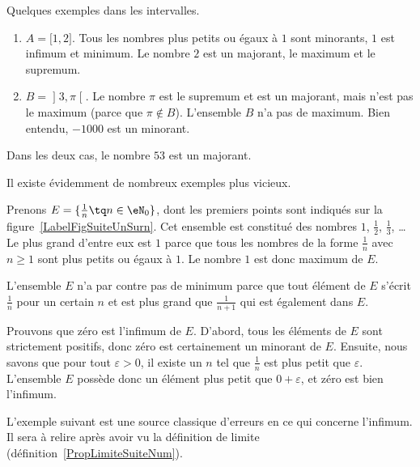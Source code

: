 \begin{example}
	Quelques exemples dans les intervalles.
	\begin{enumerate}
		\item
		      $A=\mathopen[ 1 , 2 \mathclose]$. Tous les nombres plus petits ou égaux à $1$ sont minorants, $1$ est infimum et minimum. Le nombre $2$ est un majorant, le maximum et le supremum.
		\item
		      $B=\mathopen] 3 , \pi \mathclose[$. Le nombre $\pi$ est le supremum et est un majorant, mais n'est pas le maximum (parce que $\pi\notin B$). L'ensemble $B$ n'a pas de maximum. Bien entendu, $-1000$ est un minorant.
	\end{enumerate}
	Dans les deux cas, le nombre $53$ est un majorant.
\end{example}

Il existe évidemment de nombreux exemples plus vicieux.

\begin{example}
	Prenons $E=\{ \frac{1}{ n }\tq n\in\eN_0 \}$, dont les premiers points sont indiqués sur la figure~\ref{LabelFigSuiteUnSurn}. Cet ensemble est constitué des nombres $1$, $\frac{ 1 }{2}$, $\frac{1}{ 3 }$, \ldots Le plus grand d'entre eux est $1$ parce que tous les nombres de la forme $\frac{1}{ n }$ avec $n\geq 1$ sont plus petits ou égaux à $1$. Le nombre $1$ est donc maximum de $E$.

	L'ensemble $E$ n'a par contre pas de minimum parce que tout élément de $E$ s'écrit $\frac{1}{ n }$ pour un certain $n$ et est plus grand que $\frac{1}{ n+1 }$ qui est également dans $E$.

	Prouvons que zéro est l'infimum de $E$. D'abord, tous les éléments de $E$ sont strictement positifs, donc zéro est certainement un minorant de $E$. Ensuite, nous savons que pour tout $\varepsilon>0$, il existe un $n$ tel que $\frac{1}{ n }$ est plus petit que $\varepsilon$. L'ensemble $E$ possède donc un élément plus petit que $0+\varepsilon$, et zéro est bien l'infimum.
\end{example}

\newcommand{\CaptionFigSuiteUnSurn}{Les premiers points du type $x_n=1/n$.}


L'exemple suivant est une source classique d'erreurs en ce qui concerne l'infimum. Il sera à relire après avoir vu la définition de limite (définition~\ref{PropLimiteSuiteNum}).

